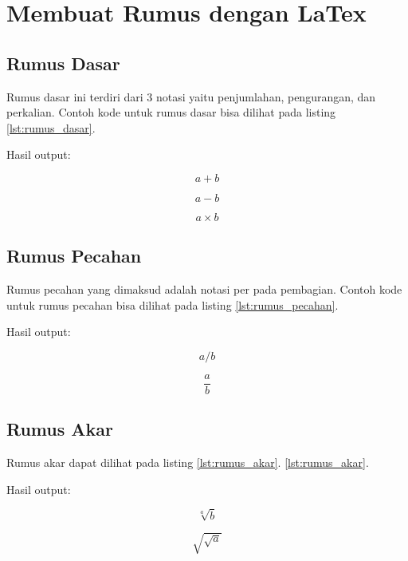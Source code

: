 \section{Membuat Rumus dengan LaTex}
\subsection{Rumus Dasar}
Rumus dasar ini terdiri dari 3 notasi yaitu penjumlahan, pengurangan, dan perkalian. Contoh kode untuk rumus dasar bisa dilihat pada listing \ref{lst:rumus_dasar}.

Hasil output:

$$ a+b$$

$$ a-b$$

$$ a \times b$$

\subsection{Rumus Pecahan}
Rumus pecahan yang dimaksud adalah notasi per pada pembagian. Contoh kode untuk rumus pecahan bisa dilihat pada listing \ref{lst:rumus_pecahan}.

Hasil output:

$$ a/b$$

$$ \frac {a}{b}$$

\subsection{Rumus Akar}
Rumus akar dapat dilihat pada listing \ref{lst:rumus_akar}.
\ref{lst:rumus_akar}.

Hasil output:

$$ \sqrt[a]{b}$$

$$ \sqrt{\sqrt{a}}$$